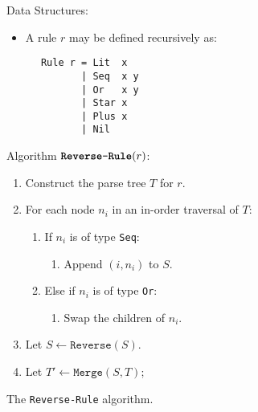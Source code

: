 \begin{figure}[tr]
\begin{framed}
  Data Structures:
  \begin{itemize}
    \item A rule $r$ may be defined recursively as:
  \end{itemize}
    \begin{verbatim}
      Rule r = Lit  x
             | Seq  x y
             | Or   x y
             | Star x
             | Plus x
             | Nil   
    \end{verbatim}

Algorithm $\textbf{\texttt{Reverse-Rule}}(r)$:
\begin{enumerate}
  \item Construct the parse tree $T$ for $r$.
  \item For each node $n_i$ in an in-order traversal of $T$:
    \begin{enumerate}
      \item If $n_i$ is of type \texttt{Seq}:
	\begin{enumerate}
          \item Append $(i, n_i)$ to $S$.
	\end{enumerate}
      \item Else if $n_i$ is of type \texttt{Or}:
	\begin{enumerate}
          \item Swap the children of $n_i$.
	 \end{enumerate}
    \end{enumerate}
  \item Let $S  \leftarrow \texttt{Reverse}(S)$.
  \item Let $T' \leftarrow \texttt{Merge}(S, T)$;
\end{enumerate}
\end{framed}
\label{alg:revgrammar}
\caption{The \texttt{Reverse-Rule} algorithm.}
\end{figure}
